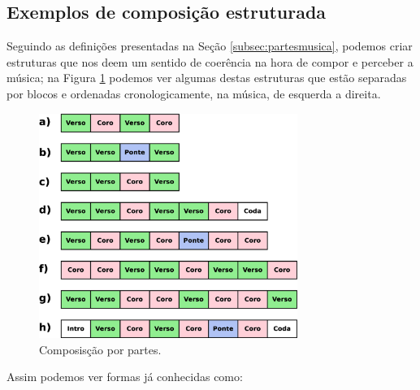 

\subsection{Exemplos de composição estruturada}
\label{subsec:expartesmusica}

Seguindo as definições presentadas na Seção \ref{subsec:partesmusica},
podemos criar estruturas que nos deem um sentido de coerência na hora de compor e perceber a música;
na Figura \ref{fig:partes-musica-ex1} podemos ver algumas destas estruturas 
que estão separadas por blocos e ordenadas cronologicamente, na música, de esquerda a direita.
     \begin{figure}[!ht]
	     \centering
	     \includegraphics[width=0.75\textwidth]{chapters/cap-musica-topicos/partes-musica-ex1.eps}
	     \caption{Composisção por partes.}
	     \label{fig:partes-musica-ex1}
     \end{figure}
Assim podemos ver formas já conhecidas como:
